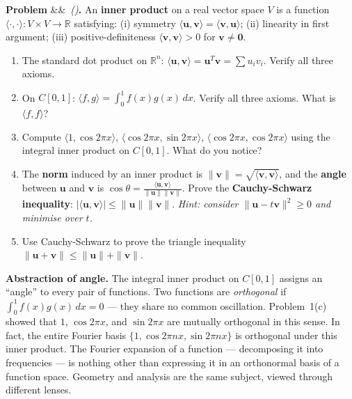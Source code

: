 \documentclass[12pt,a4paper]{article}
\newcounter{problem}
\newenvironment{problem}[1][]{\refstepcounter{problem}\par\vspace{6pt}\noindent\textbf{\color{MidBlue}Problem \theproblem}\ifx&#1&\else\ \textit{(#1)}\fi\textbf{.}\enskip}{\par\vspace{4pt}}
\begin{document}
\begin{problem}
An \textbf{inner product} on a real vector space $V$ is a function $\langle\cdot,\cdot\rangle : V\times V\to\mathbb{R}$ satisfying: (i) symmetry $\langle\mathbf{u},\mathbf{v}\rangle = \langle\mathbf{v},\mathbf{u}\rangle$; (ii) linearity in first argument; (iii) positive-definiteness $\langle\mathbf{v},\mathbf{v}\rangle > 0$ for $\mathbf{v}\neq\mathbf{0}$.

\begin{enumerate}[label=(\alph*),topsep=2pt]
  \item The standard dot product on $\mathbb{R}^n$: $\langle\mathbf{u},\mathbf{v}\rangle = \mathbf{u}^T\mathbf{v} = \sum u_i v_i$. Verify all three axioms.
  \item On $C[0,1]$: $\langle f,g\rangle = \int_0^1 f(x)g(x)\,dx$. Verify all three axioms. What is $\langle f,f\rangle$?
  \item Compute $\langle 1,\cos 2\pi x\rangle$, $\langle\cos 2\pi x,\sin 2\pi x\rangle$, $\langle\cos 2\pi x,\cos 2\pi x\rangle$ using the integral inner product on $C[0,1]$. What do you notice?
  \item The \textbf{norm} induced by an inner product is $\|\mathbf{v}\| = \sqrt{\langle\mathbf{v},\mathbf{v}\rangle}$, and the \textbf{angle} between $\mathbf{u}$ and $\mathbf{v}$ is $\cos\theta = \frac{\langle\mathbf{u},\mathbf{v}\rangle}{\|\mathbf{u}\|\|\mathbf{v}\|}$. Prove the \textbf{Cauchy-Schwarz inequality}: $|\langle\mathbf{u},\mathbf{v}\rangle| \leq \|\mathbf{u}\|\|\mathbf{v}\|$. \textit{Hint: consider $\|\mathbf{u} - t\mathbf{v}\|^2 \geq 0$ and minimise over $t$.}
  \item Use Cauchy-Schwarz to prove the triangle inequality $\|\mathbf{u}+\mathbf{v}\| \leq \|\mathbf{u}\|+\|\mathbf{v}\|$.
\end{enumerate}
\end{problem}

\begin{thought}
\textbf{Abstraction of angle.}
The integral inner product on $C[0,1]$ assigns an ``angle'' to every pair of functions. Two functions are \emph{orthogonal} if $\int_0^1 f(x)g(x)\,dx = 0$ --- they share no common oscillation. Problem~1(c) showed that $1$, $\cos 2\pi x$, and $\sin 2\pi x$ are mutually orthogonal in this sense. In fact, the entire Fourier basis $\{1, \cos 2\pi nx, \sin 2\pi nx\}$ is orthogonal under this inner product. The Fourier expansion of a function --- decomposing it into frequencies --- is nothing other than expressing it in an orthonormal basis of a function space. Geometry and analysis are the same subject, viewed through different lenses.
\end{thought}
\end{document}
